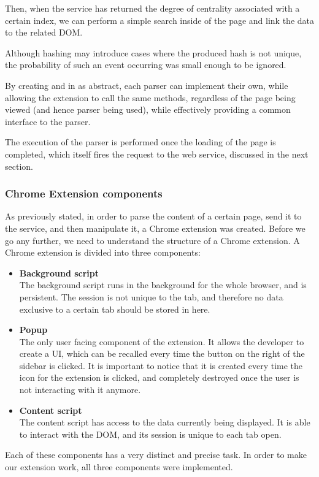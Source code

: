 Then, when the service has returned the degree of centrality associated with a certain index, we can perform a simple search inside of the page and link the data to the related DOM. 

Although hashing may introduce cases where the produced hash is not unique, the probability of such an event occurring was small enough to be ignored.

By creating  and  in  as abstract, each parser can implement their own, while allowing the extension to call the same methods, regardless of the page being viewed (and hence parser being used), while effectively providing a common interface to the parser. 

The execution of the parser is performed once the loading of the page is completed, which itself fires the request to the web service, discussed in the next section.


\subsubsection{Chrome Extension components}
As previously stated, in order to parse the content of a certain page, send it to the service, and then manipulate it, a Chrome extension was created. Before we go any further, we need to understand the structure of a Chrome extension. A Chrome extension is divided into three components:
\begin{itemize}
\item \textbf{Background script}\\
The background script runs in the background for the whole browser, and is persistent. The session is not unique to the tab, and therefore no data exclusive to a certain tab should be stored in here.
\item \textbf{Popup}\\
The only user facing component of the extension. It allows the developer to create a UI, which can be recalled every time the button on the right of the sidebar is clicked. It is important to notice that it is created every time the icon for the extension is clicked, and completely destroyed once the user is not interacting with it anymore. 
\item \textbf{Content script}\\
The content script has access to the data currently being displayed. It is able to interact with the DOM, and its session is unique to each tab open. 
\end{itemize}
Each of these components has a very distinct and precise task. In order to make our extension work, all three components were implemented. 

